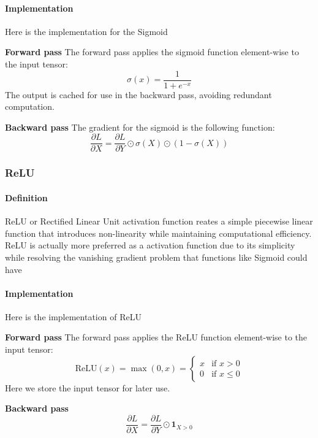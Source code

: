 \documentclass[conference]{IEEEtran}
\begin{document}
\paragraph{Implementation} Here is the implementation for the Sigmoid

\textbf{Forward pass}
The forward pass applies the sigmoid function element-wise to the input tensor:
\begin{equation}
\sigma(x) = \frac{1}{1 + e^{-x}}
\end{equation}
The output is cached for use in the backward pass, avoiding redundant computation.

\textbf{Backward pass} The gradient for the sigmoid is the following function: 
\begin{equation}
\frac{\partial L}{\partial X} = \frac{\partial L}{\partial Y} \odot \sigma(X) \odot (1 - \sigma(X))
\end{equation}

\subsubsection{ReLU} 
\paragraph{Definition} ReLU or Rectified Linear Unit activation function reates a simple piecewise linear function that introduces non-linearity while maintaining computational efficiency. ReLU is actually more preferred as a activation function due to its simplicity while resolving the vanishing gradient problem that functions like Sigmoid could have

\paragraph{Implementation} Here is the implementation of ReLU

\textbf{Forward pass} The forward pass applies the ReLU function element-wise to the input tensor:
\begin{equation}
\text{ReLU}(x) = \max(0, x) = \begin{cases}
x & \text{if } x > 0 \\
0 & \text{if } x \leq 0
\end{cases}
\end{equation}
Here we store the input tensor for later use.

\textbf{Backward pass}
\begin{equation}
\frac{\partial L}{\partial X} = \frac{\partial L}{\partial Y} \odot \mathbf{1}_{X > 0}
\end{equation}
\end{document}
